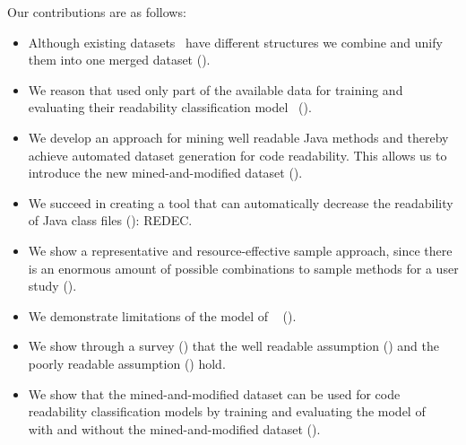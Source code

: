 \documentclass[%
class=scrreprt,
chapterprefix=false,%
open=right,%
twoside=false,%
paper=a4,%
logofile={Logo\_zentral\_farbig\_EN.png},%
thesistype=master,%
UKenglish,%
]{se2thesis}
\theoremstyle{definition}
\newcommand{\citeolddataset}{\cite{buse2009learning, dorn2012general, scalabrino2018comprehensive}\xspace}
\newcommand{\rdh}{REDEC\xspace}
\begin{document}
	Our contributions are as follows:
	\begin{itemize}
		\item Although existing datasets~\citeolddataset have different structures we combine and unify them into one merged dataset ().
		\item We reason that \citeauthor{mi2022towards} used only part of the available data for training and evaluating their readability classification model~\cite{mi2022towards} ().
		\item We develop an approach for mining well readable Java methods and thereby achieve automated dataset generation for code readability. This allows us to introduce the new mined-and-modified dataset ().
		\item We succeed in creating a tool that can automatically decrease the readability of Java class files (): \rdh.
		\item We show a representative and resource-effective sample approach, since there is an enormous amount of possible combinations to sample methods for a user study ().
		\item We demonstrate limitations of the model of \citeauthor{mi2022towards}~\cite{mi2022towards} ().
		\item We show through a survey () that the well readable assumption () and the poorly readable assumption () hold.
		\item We show that the mined-and-modified dataset can be used for code readability classification models by training and evaluating the model of \citeauthor{mi2022towards}~\cite{mi2022towards} with and without the mined-and-modified dataset ().
	\end{itemize}
	
	
\end{document}

